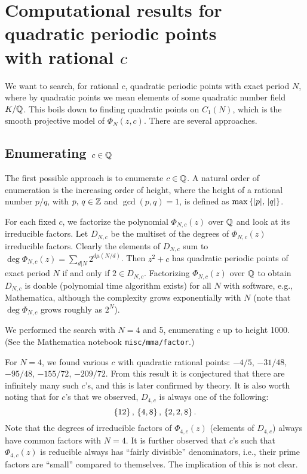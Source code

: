 



\tableofcontents

\section{Computational results for quadratic periodic points\\ with
  rational $c$}

We want to search, for rational $c$, quadratic periodic points with
exact period $N$, where by quadratic points we mean elements of
some quadratic number field $K/\mathbb{Q}$. This boils down to finding
quadratic points on $C_1(N)$, which is the smooth projective model of
$\Phi_N(z, c)$. There are several approaches.

\subsection{Enumerating $c \in \mathbb{Q}$}

The first possible approach is to enumerate $c \in \mathbb{Q}$. A natural
order of enumeration is the increasing order of height, where the
height of a rational number $p/q$, with $p,\, q \in \mathbb{Z}$ and $\gcd(p,
q) = 1$, is defined as $\max\left\{|p|,\, |q|\right\}$.

For each fixed $c$, we factorize the polynomial $\Phi_{N,c}(z)$ over
$\mathbb{Q}$ and look at its irreducible factors. Let $D_{N,c}$ be the
multiset of the degrees of $\Phi_{N,c}(z)$ irreducible
factors. Clearly the elements of $D_{N,c}$ sum to $\deg \Phi_{N,c}(z)
= \sum_{d|N}2^{d \mu(N/d)}$. Then $z^2 + c$ has quadratic periodic
points of exact period $N$ if and only if $2 \in D_{N,c}$. Factorizing
$\Phi_{N,c}(z)$ over $\mathbb{Q}$ to obtain $D_{N,c}$ is doable (polynomial
time algorithm exists) for all $N$ with software, e.g., Mathematica,
although the complexity grows exponentially with $N$ (note that $\deg
\Phi_{N,c}$ grows roughly as $2^N$).

We performed the search with $N = 4$ and 5, enumerating $c$ up to
height 1000. (See the Mathematica notebook \texttt{misc/mma/factor}.)

For $N = 4$, we found various $c$ with quadratic rational points:
$-4/5$, $-31/48$, $-95/48$, $-155/72$, $-209/72$. From this result it
is conjectured that there are infinitely many such $c$'s, and this is
later confirmed by theory. It is also worth noting that for $c$'s that
we observed, $D_{4,c}$ is always one of the following:
\[
\left\{12\right\},\, \left\{4, 8\right\},\, \left\{2, 2, 8\right\}.
\]
Note that the degrees of irreducible factors of $\Phi_{4,c}(z)$
(elements of $D_{4,c}$) always have common factors with $N = 4$. It is
further observed that $c$'s such that $\Phi_{4,c}(z)$ is reducible
always has ``fairly divisible'' denominators, i.e., their prime
factors are ``small'' compared to themselves. The implication of this
is not clear.

